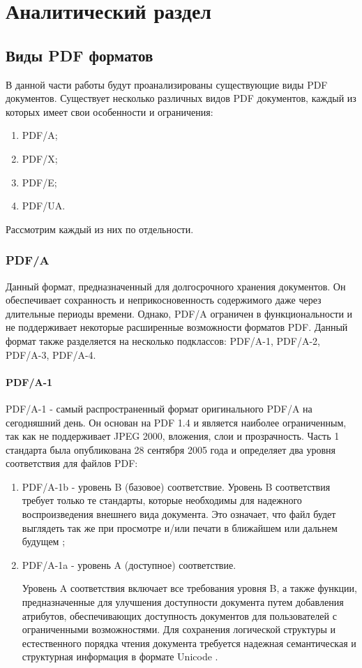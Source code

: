 \chapter{Аналитический раздел}
\section{Виды PDF форматов}
В данной части работы будут проанализированы существующие виды PDF документов.
Существует несколько различных видов PDF документов, каждый из которых имеет свои особенности и ограничения:
\begin{enumerate}
	\item PDF/A;
	\item PDF/X;
	\item PDF/E;
	\item PDF/UA.
\end{enumerate}
Рассмотрим каждый из них по отдельности.
\subsection{PDF/A}
Данный формат, предназначенный для долгосрочного хранения документов. Он обеспечивает сохранность и неприкосновенность содержимого даже через длительные периоды времени. Однако, PDF/A ограничен в функциональности и не поддерживает некоторые расширенные возможности форматов PDF.
Данный формат также разделяется на несколько подклассов: PDF/A-1, PDF/A-2, PDF/A-3, PDF/A-4.
\subsubsection{PDF/A-1}
PDF/A-1 - самый распространенный формат оригинального PDF/A на сегодняшний день. Он основан на PDF 1.4 и является наиболее ограниченным, так как не поддерживает JPEG 2000, вложения, слои и прозрачность. Часть 1 стандарта была опубликована 28 сентября 2005 года и определяет два уровня соответствия для файлов PDF:
\begin{enumerate}

\item PDF/A-1b - уровень B (базовое) соответствие.
Уровень B соответствия требует только те стандарты, которые необходимы для надежного воспроизведения внешнего вида документа. Это означает, что файл будет выглядеть так же при просмотре и/или печати в ближайшем или дальнем будущем \cite{pdf_a_versions};

\item PDF/A-1a - уровень A (доступное) соответствие.

Уровень A соответствия включает все требования уровня B, а также функции, предназначенные для улучшения доступности документа путем добавления атрибутов, обеспечивающих доступность документов для пользователей с ограниченными возможностями. Для сохранения логической структуры и естественного порядка чтения документа требуется надежная семантическая и структурная информация в формате Unicode \cite{pdf_a_versions}.
\end{enumerate}

